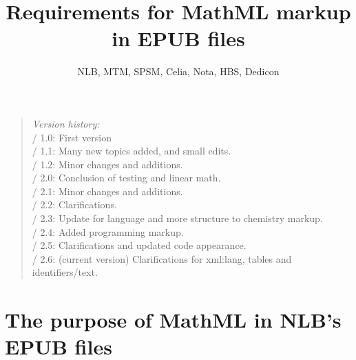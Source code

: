 \documentclass[english,a4paper,11pt]{article}
\title{Requirements for MathML markup\\ in EPUB files}
\author{NLB, MTM, SPSM, Celia, Nota, HBS, Dedicon}
\begin{document}
	\pagebottomtext
	\thispagestyle{empty}
	\raggedright
	
	\maketitle
	\thispagestyle{empty}
	\vfill
	\begin{quote} {
		\bigskip
		\emph{Version history:}\\
		\textbullet{} / 1.0: First version\\
		\textbullet{} / 1.1: Many new topics added, and small edits.\\
		\textbullet{} / 1.2: Minor changes and additions.\\
		\textbullet{} / 2.0: Conclusion of testing and linear math.\\
        \textbullet{} / 2.1: Minor changes and additions.\\
        \textbullet{} / 2.2: Clarifications.\\
        \textbullet{} / 2.3: Update for language and more structure to chemistry markup.\\
        \textbullet{} / 2.4: Added programming markup.\\
        \textbullet{} / 2.5: Clarifications and updated code appearance.\\
        \textbullet{} / 2.6: (current version) Clarifications for xml:lang, tables and identifiers/text.\\
        \bigskip
	}
	\end{quote}
	\vfill
	\pagebreak
	\tableofcontents
	\vfill
	\pagebreak

\section{The purpose of MathML in NLB's EPUB files}
\end{document}

